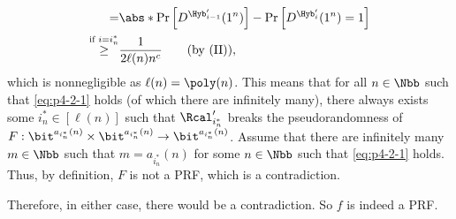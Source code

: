 \begin{answer}[b]
\begin{align*}
        =& \abs*{\Pr\left[D^{\Hyb'_{i-1}}(1^n) \right] - \Pr\left[D^{\Hyb'_{i}}(1^n)=1  \right]}\\
        \stackrel{\textrm{if } i=i^\ast_n}\ge& \frac{1}{2\ell(n) n^c}
        \qquad \textrm{(by (II))},
    \end{align*}
    which is nonnegligible as $\ell(n)=\poly(n)$. This means that for all $n\in\Nbb$ such that \eqref{eq:p4-2-1} holds (of which there are infinitely many), there always exists some $i^\ast_n\in [\ell(n)]$ such that $\Rcal'_{i^\ast_n}$ breaks the pseudorandomness of $F:\bit^{a_{i^\ast_n}(n)}\times \bit^{a_{i^\ast_n}(n)}\to \bit^{a_{i^\ast_n}(n)}$. Assume that there are infinitely many $m\in\Nbb$ such that $m=a_{i^\ast_n}(n)$ for some $n\in\Nbb$ such that \eqref{eq:p4-2-1} holds. Thus, by definition, $F$ is not a PRF, which is a contradiction.

    Therefore, in either case, there would be a contradiction. So $f$ is indeed a PRF.
\end{answer}